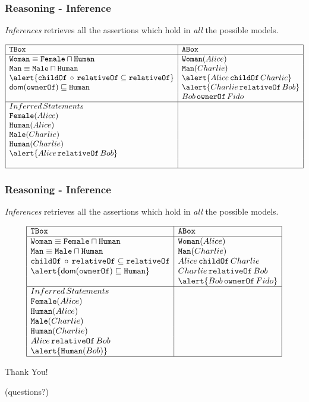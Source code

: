 \documentclass[8pt]{beamer}
\newcommand{\TBox}{{\tt TBox}}
\newcommand{\ABox}{{\tt ABox}}
\newcommand{\Human}{\mathtt{Human}}
\newcommand{\Male}{\mathtt{Male}}
\newcommand{\Female}{\mathtt{Female}}
\newcommand{\Man}{\mathtt{Man}}
\newcommand{\Woman}{\mathtt{Woman}}
\newcommand{\relative}{\mathtt{relativeOf}}
\newcommand{\child}{\mathtt{childOf}}
\newcommand{\owner}{\mathtt{ownerOf}}
\newcommand{\Alice}{Alice}
\newcommand{\Bob}{Bob}
\newcommand{\Charlie}{Charlie}
\newcommand{\Fido}{Fido}
\begin{document}
\begin{frame}
 \frametitle{Reasoning - Inference}

 \emph{Inferences} retrieves all the assertions which hold in \emph{all} the possible models.
 
 \[
  \begin{array}{|l|l|}
   \hline
   \TBox & \ABox\\
   \hline
   \Woman \equiv \Female \sqcap \Human & \Woman(\Alice)\\
   \Man \equiv \Male \sqcap \Human & \Man(\Charlie)\\
   \alert{\child\,\circ\,\relative \subseteq \relative} &  \alert{\Alice\,\child\,\Charlie}\\
   \dom(\owner) \Issub \Human & \alert{\Charlie\,\relative\,\Bob}\\
   & \Bob\,\owner\,\Fido\\
   \hline
   Inferred\,Statements & \\
   \Female(\Alice)& \\
   \Human(\Alice)& \\
   \Male(\Charlie) & \\
   \Human(\Charlie) & \\
   \alert{\Alice\,\relative\,\Bob} & \\
   \phantom{\Human(\Bob)} & \\
   \hline
  \end{array}
 \]
\end{frame}

\begin{frame}
 \frametitle{Reasoning - Inference}

 \emph{Inferences} retrieves all the assertions which hold in \emph{all} the possible models.
 
 \[
  \begin{array}{|l|l|}
   \hline
   \TBox & \ABox\\
   \hline
   \Woman \equiv \Female \sqcap \Human & \Woman(\Alice)\\
   \Man \equiv \Male \sqcap \Human & \Man(\Charlie)\\
   \child\,\circ\,\relative \subseteq \relative &  \Alice\,\child\,\Charlie\\
   \alert{\dom(\owner) \Issub \Human} & \Charlie\,\relative\,\Bob\\
   & \alert{\Bob\,\owner\,\Fido}\\
   \hline
   Inferred\,Statements & \\
   \Female(\Alice)& \\
   \Human(\Alice)& \\
   \Male(\Charlie) & \\
   \Human(\Charlie) & \\
   \Alice\,\relative\,\Bob & \\
   \alert{\Human(\Bob)} & \\
   \hline
  \end{array}
 \]
\end{frame}

\begin{frame}
\begin{center}
 \Large{Thank You!}
 \vspace{\baselineskip}
 
 (questions?)
\end{center}

\end{frame}


\end{document}
